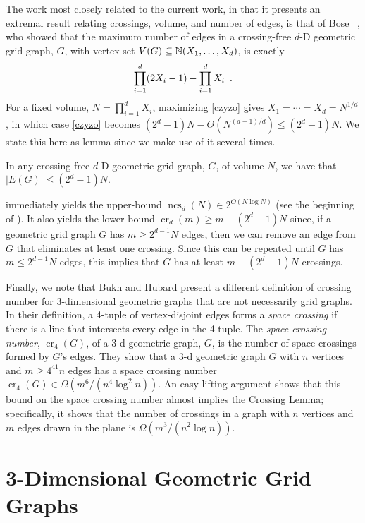 \documentclass[12pt]{article}
\newcommand{\n}{N}
\DeclareMathOperator{\crs}{cr}
\DeclareMathOperator{\ncs}{ncs}
\begin{document}
The work most closely related to the current work, in that it presents
an extremal result relating crossings, volume, and number of edges, is
that of Bose \etal~\cite{bose.czyzowicz.ea:maximum}, who showed that the
maximum number of edges in a crossing-free $d$-D geometric grid graph,
$G$, with vertex set $V(G)\subseteq \mathbb{N}(X_1,\ldots,X_d)$, is exactly
\begin{equation}
    \prod_{i=1}^d (2X_i-1) - \prod_{i=1}^d X_i \enspace . \eqlabel{czyzo}
\end{equation}
For a fixed volume, $\n=\prod_{i=1}^d X_i$, maximizing \eqref{czyzo} gives
$X_1=\cdots=X_d=\n^{1/d}$, in which case \eqref{czyzo} becomes $(2^d-1)\n -
\Theta(\n^{(d-1)/d})\le (2^d-1)\n$.  We state this here as lemma since we
make use of it several times.
\begin{lem}
  In any crossing-free $d$-D geometric grid graph, $G$, of volume $\n$,
  we have that $|E(G)|\le(2^d-1)\n$.
\end{lem}
 immediately yields the upper-bound
$\ncs_d(\n)\in2^{O(\n\log\n)}$ (see the beginning of ).
It also yields the lower-bound $\crs_d(m)\ge m-(2^{d}-1)N$ since,
if a geometric grid graph $G$ has $m\ge 2^{d-1}N$ edges, then we can
remove an edge from $G$ that eliminates at least one crossing.
Since this can be repeated until $G$ has $m\le 2^{d-1}N$ edges, this
implies that $G$ has at least $m-(2^d-1)N$ crossings.

Finally, we note that Bukh and Hubard \cite{bukh.hubard:space} present a
different definition of crossing number for 3-dimensional geometric graphs
that are not necessarily grid graphs.  In their definition, a 4-tuple
of vertex-disjoint edges forms a \emph{space crossing} if there is
a line that intersects every edge in the 4-tuple.  The \emph{space
crossing number}, $\crs_4(G)$, of a 3-d geometric graph, $G$, is the
number of space crossings formed by $G$'s edges.  They show that a
3-d geometric graph $G$ with $n$ vertices and $m\ge 4^{41}n$ edges
has a space crossing number $\crs_4(G) \in \Omega(m^6/(n^4\log^2 n))$.
An easy lifting argument shows that this bound on the space crossing
number almost implies the Crossing Lemma; specifically, it shows that
the number of crossings in a graph with $n$ vertices and $m$ edges drawn
in the plane is $\Omega(m^3/(n^2\log n))$.

\section{3-Dimensional Geometric Grid Graphs}
\end{document}
